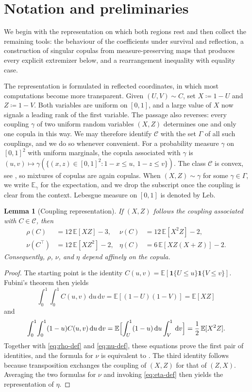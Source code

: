 \documentclass[11pt,a4paper]{article}
\newtheorem{lemma}[theorem]{Lemma}
\theoremstyle{remark}
\newcommand{\E}{\mathbb{E}}
\newcommand{\de}{\,\mathrm{d}}
\newcommand{\1}{\mathbf{1}}
\newcommand{\CC}{\mathcal{C}}
\newcommand{\Gam}{\Gamma}
\begin{document}
\section{Notation and preliminaries}
\label{sec:preliminaries}

We begin with the representation on which both regions rest and then collect the remaining tools: the behaviour of the coefficients under survival and reflection, a construction of singular copulas from measure-preserving maps that produces every explicit extremizer below, and a rearrangement inequality with equality case.

The representation is formulated in reflected coordinates, in which most computations become more transparent.
Given $(U,V)\sim C$, set $X\coloneqq1-U$ and $Z\coloneqq1-V$.
Both variables are uniform on $[0,1]$, and a large value of $X$ now signals a leading rank of the first variable.
The passage also reverses: every coupling $\gamma$ of two uniform random variables $(X,Z)$ determines one and only one copula in this way.
We may therefore identify $\CC$ with the set $\Gam$ of all such couplings, and we do so whenever convenient.
For a probability measure $\gamma$ on $[0,1]^2$ with uniform marginals, the copula associated with $\gamma$ is $(u,v)\mapsto\gamma(\{(x,z)\in[0,1]^2:1-x\le u,\ 1-z\le v\})$.
The class $\CC$ is convex, see \cite[Thm.~1.4.5]{durante2016principles}, so mixtures of copulas are again copulas.
When $(X,Z)\sim\gamma$ for some $\gamma\in\Gam$, we write $\E_\gamma$ for the expectation, and we drop the subscript once the coupling is clear from the context.
Lebesgue measure on $[0,1]$ is denoted by $\mathrm{Leb}$.

\begin{lemma}[Coupling representation]
\label{lem:coupling}
If $(X,Z)$ follows the coupling associated with $C\in\CC$, then
\begin{equation}
  \label{eq:coupling-moments}
  \begin{aligned}
  \rho(C)&=12\,\E[XZ]-3,
  &\nu(C)&=12\,\E[X^2Z]-2,\\
  \nu(C^\top)&=12\,\E[XZ^2]-2,
  &\eta(C)&=6\,\E[XZ(X+Z)]-2.
  \end{aligned}
\end{equation}
Consequently, $\rho$, $\nu$, and $\eta$ depend affinely on the copula.
\end{lemma}

\begin{proof}
The starting point is the identity $C(u,v)=\E[\1\{U\le u\}\1\{V\le v\}]$.
Fubini's theorem then yields
\[
  \int_0^1\!\int_0^1C(u,v)\de u\de v
  =\E[(1-U)(1-V)]=\E[XZ]
\]
and
\[
  \int_0^1\!\int_0^1(1-u)C(u,v)\de u\de v
  =\E\Bigl[\int_U^1(1-u)\de u\int_V^1\de v\Bigr]
  =\frac12\,\E[X^2Z].
\]
Together with \eqref{eq:rho-def} and \eqref{eq:nu-def}, these equations prove the first pair of identities, and the formula for $\nu$ is equivalent to \cite[Frm.~(1)]{genest2003blest}.
The third identity follows because transposition exchanges the coupling of $(X,Z)$ for that of $(Z,X)$.
Averaging the two formulas for $\nu$ and invoking \eqref{eq:eta-def} then yields the representation of $\eta$.
\end{proof}
\end{document}

